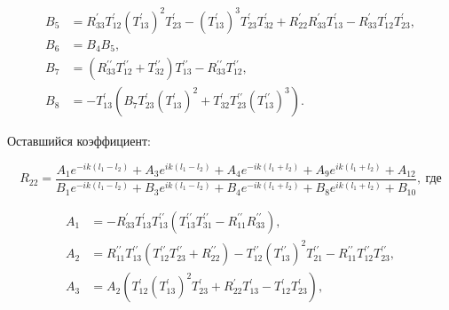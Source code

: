 \documentclass[a4 paper, 12 pt]{extarticle}
\begin{document}
\[\begin{aligned}
   B_5 &= R_{33}^\prime T_{12}^\prime (T_{13}^\prime)^2 T_{23}^\prime - (T_{13}^\prime)^3 T_{23}^\prime T_{32}^\prime + R_{22}^\prime R_{33}^\prime T_{13}^\prime - R_{33}^\prime T_{12}^\prime T_{23}^\prime ,\\
   B_6 &= B_4 B_5 ,\\
   B_7 &= \left(R_{33}^{\prime\prime} T_{12}^{\prime\prime} + T_{32}^{\prime\prime}\right) T_{13}^{\prime\prime} - R_{33}^{\prime\prime} T_{12}^{\prime\prime} ,\\
   B_8 &= -T_{13}^\prime \left(B_7 T_{23}^\prime (T_{13}^\prime)^2 + T_{32}^\prime T_{23}^{\prime\prime} (T_{13}^{\prime\prime})^3\right).
   \end{aligned}\]
   
   Оставшийся коэффициент:
   
   \begin{equation}
   \label{R22}
   R_{22} = \frac{A_1 e^{-ik\left(l_1-l_2\right)} + A_3 e^{ik\left(l_1-l_2\right)} + A_4 e^{-ik\left(l_1+l_2\right)} + A_9 e^{ik\left(l_1+l_2\right)} + A_{12}}{B_1 e^{-ik\left(l_1-l_2\right)} + B_3 e^{ik\left(l_1-l_2\right)} + B_4 e^{-ik\left(l_1+l_2\right)} + B_8 e^{ik\left(l_1+l_2\right)} + B_{10}},  \ \text{где} 
   \end{equation}
   
   \[
   \begin{aligned}
   A_1 &= -R_{33}^\prime T_{13}^\prime T_{13}^{\prime\prime} \left(T_{13}^{\prime\prime} T_{31}^{\prime\prime} - R_{11}^{\prime\prime} R_{33}^{\prime\prime}\right), \\
   A_2 &= R_{11}^{\prime\prime} T_{13}^{\prime\prime} \left(T_{12}^{\prime\prime} T_{23}^{\prime\prime}  + R_{22}^{\prime\prime}\right) - T_{12}^{\prime\prime} (T_{13}^{\prime\prime})^2 T_{21}^{\prime\prime} - R_{11}^{\prime\prime} T_{12}^{\prime\prime} T_{23}^{\prime\prime}, \\
   A_3 &=  A_2 \left(T_{12}^\prime (T_{13}^\prime)^2 T_{23}^\prime + R_{22}^\prime T_{13}^\prime - T_{12}^\prime T_{23}^\prime\right),\\
   \end{aligned}\]
   
\end{document}

